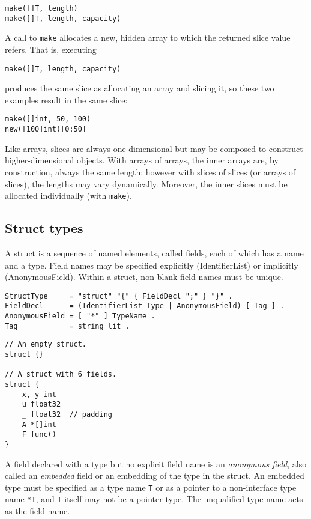 \begin{Verbatim}[frame=single]
make([]T, length)
make([]T, length, capacity)
\end{Verbatim}

A call to \texttt{make} allocates a new, hidden array to which the
returned slice value refers. That is, executing

\begin{Verbatim}[frame=single]
make([]T, length, capacity)
\end{Verbatim}

produces the same slice as allocating an array and slicing it, so these
two examples result in the same slice:

\begin{Verbatim}[frame=single]
make([]int, 50, 100)
new([100]int)[0:50]
\end{Verbatim}

Like arrays, slices are always one-dimensional but may be composed to
construct higher-dimensional objects. With arrays of arrays, the inner
arrays are, by construction, always the same length; however with slices
of slices (or arrays of slices), the lengths may vary dynamically.
Moreover, the inner slices must be allocated individually (with
\texttt{make}).

\subsection*{Struct types}

A struct is a sequence of named elements, called fields, each of which
has a name and a type. Field names may be specified explicitly
(IdentifierList) or implicitly (AnonymousField). Within a struct,
non-blank field names must be
unique.

\begin{Verbatim}[frame=single]
StructType     = "struct" "{" { FieldDecl ";" } "}" .
FieldDecl      = (IdentifierList Type | AnonymousField) [ Tag ] .
AnonymousField = [ "*" ] TypeName .
Tag            = string_lit .
\end{Verbatim}

\begin{Verbatim}[frame=single]
// An empty struct.
struct {}

// A struct with 6 fields.
struct {
    x, y int
    u float32
    _ float32  // padding
    A *[]int
    F func()
}
\end{Verbatim}

A field declared with a type but no explicit field name is an
\emph{anonymous field}, also called an \emph{embedded} field or an
embedding of the type in the struct. An embedded type must be specified
as a type name \texttt{T} or as a pointer to a non-interface type name
\texttt{*T}, and \texttt{T} itself may not be a pointer type. The
unqualified type name acts as the field name.

